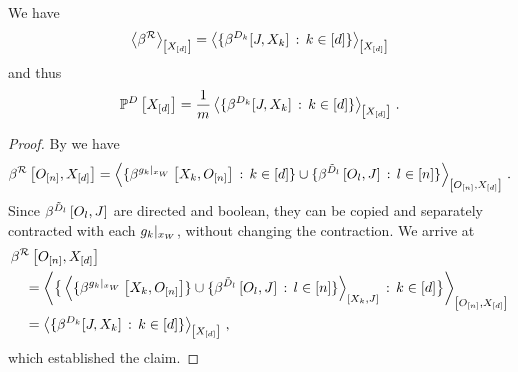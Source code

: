 \begin{theorem}
    \label{the:extractionDataCores}
    We have
    \begin{align*}
        \left\langle \beta^{\mathcal{R}}\right\rangle_{\left[ X_{[d]} \right]}
        = \left\langle \{\beta^{D_{k}}[J,X_{k}] \,:\, k\in[d]\}\right\rangle_{\left[ X_{[d]} \right]}
    \end{align*}
    and thus
    \begin{align*}
        \mathbb{P}^{D}\left[X_{[d]}\right]
        = \frac{1}{m} \left\langle \{\beta^{D_{k}}[J,X_{k}]  \,:\, k\in[d]\}\right\rangle_{\left[ X_{[d]} \right]} \, .
    \end{align*}
\end{theorem}
\begin{proof}
    By  we have
    \begin{align*}
        \bencodingofat{\extractionrelation}{\shortindvariables,\shortcatvariables} =
        \contractionof{
            \{\bencodingofat{\groundingof{\extformulaof{\atomenumerator}}}{\catvariableof{\catenumerator},\shortindvariables} \wcols \catenumeratorin\}
            \cup \{\bencodingofat{\secdatamap_{\indenumerator}}{\indvariableof{\indenumerator},\datvariable} \wcols \indenumeratorin\}
        }{\shortindvariables,\shortcatvariables} \, .
    \end{align*}
    Since $\bencodingofat{\secdatamap_{\indenumerator}}{\indvariableof{\indenumerator},\datvariable}$ are directed and boolean, they can be copied and separately contracted with each ${g_{k}}|_{x_{W}}$, without changing the contraction.
    We arrive at
    \begin{align*}
        &\bencodingofat{\extractionrelation}{\shortindvariables,\shortcatvariables} \\
        &\quad = \contractionof{
            \big\{\contractionof{
                \{\bencodingofat{\groundingof{\extformulaof{\atomenumerator}}}{\catvariableof{\catenumerator},\shortindvariables}\}
                \cup \{\bencodingofat{\secdatamap_{\indenumerator}}{\indvariableof{\indenumerator},\datvariable} \wcols \indenumeratorin\}
            }{\catvariableof{\catenumerator},\datvariable} \wcols \catenumeratorin \big\}
        }{\shortindvariables,\shortcatvariables} \\
        & \quad =  \contractionof{\{\datacoreofat{\atomenumerator}{\datvariable,\catvariableof{\atomenumerator}}  \wcols \atomenumeratorin\}}{\shortcatvariables} \, ,
    \end{align*}
    which established the claim.
\end{proof}

